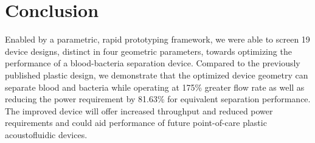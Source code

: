 

\section{Conclusion}
\label{sec:conclusion}
Enabled by a parametric, rapid prototyping framework, we were able to screen 19 device designs, distinct in four geometric parameters, towards optimizing the performance of a blood-bacteria separation device. Compared to the previously published plastic design, we demonstrate that the optimized device geometry can separate blood and bacteria while operating at 175\% greater flow rate as well as reducing the power requirement by 81.63\% for equivalent separation performance.   The improved device will offer increased throughput and reduced power requirements and could aid performance of future point-of-care plastic acoustofluidic devices.
